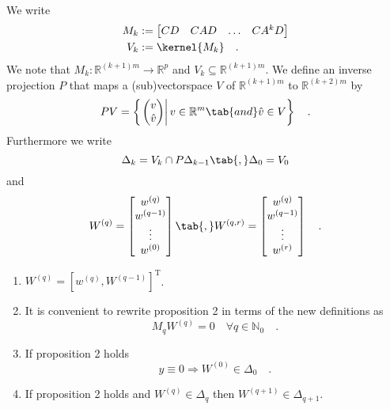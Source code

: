 \begin{definition}{}{}
	We write
	\begin{align*}
	M_k &:= \begin{bmatrix} CD & CAD & \ldots & CA^kD \end{bmatrix} \\
	V_k &:= \kernel{M_k} \quad .
	\end{align*}
	We note that $M_k:\mathbb{R}^{(k+1)m} \to \mathbb{R}^p$ and $V_k\subseteq 
	\mathbb{R}^{(k+1)m}$. We define an inverse 
	projection $P$ that maps a (sub)vectorspace $V$ of $\mathbb{R}^{(k+1)m}$ to 
	$\mathbb{R}^{(k+2)m}$ by
	\begin{equation}
	P V = \left\{ \left. \begin{pmatrix}
	v \\ \hat{v}
	\end{pmatrix}
	\right| v\in\mathbb{R}^m \tab{and} \hat{v}\in V \right\} \quad .
	\end{equation}
	Furthermore we write
	\begin{equation}
	\Delta_k = V_k \cap P\Delta_{k-1} \tab{,} \Delta_0 = V_0
	\end{equation}
	and
	\begin{equation}
	W^{(q)} = \begin{bmatrix}
	w^{(q)} \\ w^{(q-1)} \\ \vdots \\ w^{(0)} 
	\end{bmatrix} \tab{,}
	W^{(q,r)} = \begin{bmatrix}
	w^{(q)} \\ w^{(q-1)} \\ \vdots \\ w^{(r)} 
	\end{bmatrix} \quad .
	\end{equation}
\end{definition}
\begin{lemma}{}{}
	\begin{enumerate}
	\item $W^{(q)} = [w^{(q)},W^{(q-1)}]^\text{T}$.
	\item It is convenient to rewrite proposition 2 in terms of the new definitions as
		\begin{equation}
		M_q W^{(q)} = 0 \quad \forall q\in\mathbb{N}_0	 \quad .
		\end{equation}
	\item If proposition 2 holds 
		\begin{equation}
		y \equiv 0 \Rightarrow W^{(0)} \in \Delta_0  \quad .
		\end{equation}
	\item If proposition 2 holds and $W^{(q)} \in \Delta_q$ then 
	$W^{(q+1)} \in \Delta_{q+1}$. 
	\end{enumerate}
\end{lemma}
